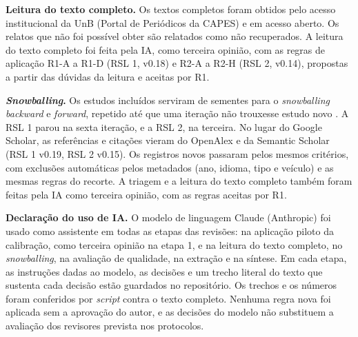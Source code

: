 \textbf{Leitura do texto completo.} Os textos completos foram obtidos pelo
acesso institucional da UnB (Portal de Periódicos da CAPES) e em acesso
aberto. Os relatos que não foi possível obter são relatados como não
recuperados. A leitura do texto completo foi feita pela IA, como terceira
opinião, com as regras de aplicação R1-A a R1-D (RSL 1, v0.18) e R2-A a R2-H
(RSL 2, v0.14), propostas a partir das dúvidas da leitura e aceitas por R1.

\textbf{\textit{Snowballing}.} Os estudos incluídos serviram de sementes para
o \textit{snowballing} \textit{backward} e \textit{forward}, repetido até que
uma iteração não trouxesse estudo novo \cite[seção 3.3]{wohlin2014}. A RSL 1
parou na sexta iteração, e a RSL 2, na terceira. No lugar do Google Scholar,
as referências e citações vieram do OpenAlex e da Semantic Scholar (RSL 1
v0.19, RSL 2 v0.15). Os registros novos passaram pelos mesmos critérios, com
exclusões automáticas pelos metadados (ano, idioma, tipo e veículo) e as
mesmas regras do recorte. A triagem e a leitura do texto completo também
foram feitas pela IA como terceira opinião, com as regras aceitas por R1.

\textbf{Declaração do uso de IA.} O modelo de linguagem Claude (Anthropic)
foi usado como assistente em todas as etapas das revisões: na aplicação
piloto da calibração, como terceira opinião na etapa 1, e na leitura do texto
completo, no \textit{snowballing}, na avaliação de qualidade, na extração e na
síntese. Em cada etapa, as instruções dadas ao modelo, as decisões e um
trecho literal do texto que sustenta cada decisão estão guardados no
repositório. Os trechos e os números foram conferidos por \textit{script}
contra o texto completo. Nenhuma regra nova foi aplicada sem a aprovação do
autor, e as decisões do modelo não substituem a avaliação dos revisores
prevista nos protocolos.
